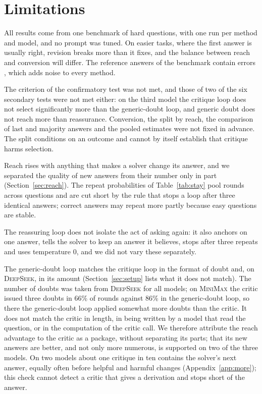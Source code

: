 \documentclass[11pt]{article}
\newcommand{\ds}{\textsc{DeepSeek}}
\newcommand{\mm}{\textsc{MiniMax}}
\begin{document}
\section*{Limitations}

All results come from one benchmark of hard questions, with one run per method and model, and no prompt was tuned.
On easier tasks, where the first answer is usually right, revision breaks more than it fixes, and the balance between reach and conversion will differ.
The reference answers of the benchmark contain errors \citep{zhai2026hleverified}, which adds noise to every method.

The criterion of the confirmatory test was not met, and those of two of the six secondary tests were not met either: on the third model the critique loop does not select significantly more than the generic-doubt loop, and generic doubt does not reach more than reassurance.
Conversion, the split by reach, the comparison of last and majority answers and the pooled estimates were not fixed in advance.
The split conditions on an outcome and cannot by itself establish that critique harms selection.

Reach rises with anything that makes a solver change its answer, and we separated the quality of new answers from their number only in part (Section~\ref{sec:reach}).
The repeat probabilities of Table~\ref{tab:stay} pool rounds across questions and are cut short by the rule that stops a loop after three identical answers; correct answers may repeat more partly because easy questions are stable.

The reassuring loop does not isolate the act of asking again: it also anchors on one answer, tells the solver to keep an answer it believes, stops after three repeats and uses temperature 0, and we did not vary these separately.

The generic-doubt loop matches the critique loop in the format of doubt and, on \ds, in its amount (Section~\ref{sec:setup} lists what it does not match).
The number of doubts was taken from \ds{} for all models; on \mm{} the critic issued three doubts in 66\% of rounds against 86\% in the generic-doubt loop, so there the generic-doubt loop applied somewhat more doubts than the critic.
It does not match the critic in length, in being written by a model that read the question, or in the computation of the critic call.
We therefore attribute the reach advantage to the critic as a package, without separating its parts; that its new answers are better, and not only more numerous, is supported on two of the three models.
On two models about one critique in ten contains the solver's next answer, equally often before helpful and harmful changes (Appendix~\ref{app:more}); this check cannot detect a critic that gives a derivation and stops short of the answer.
\end{document}
